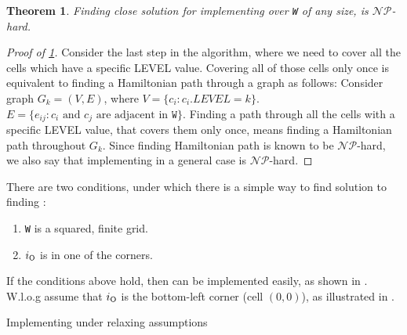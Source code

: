 \documentclass[a4paper,11pt]{article}
\newtheorem{theorem}{Theorem}
\theoremstyle{definition}
\newcommand{\opp}{{{\sf O}}\xspace}
\newcommand{\io}{{\ensuremath{i_{\opp}}}\xspace}
\newcommand{\w}{{{\texttt W}}\xspace}
\newcommand{\ltr}{{{\sf{LTR}}}\xspace}
\DeclarePairedDelimiter\abs{\lvert}{\rvert}%
\begin{document}
\begin{theorem}
Finding close solution for implementing \ltr over \w of any size, is $\mathcal{NP}$-hard.
\label{theorems: ltr hardness}
\end{theorem}
\begin{proof}[Proof of \cref{theorems: ltr hardness}]
Consider the last step in the algorithm, where we need to cover all the cells which have a specific LEVEL value.
Covering all of those cells only once is equivalent to finding a Hamiltonian path through a graph as follows:
Consider graph $G_k=(V,E)$, where $V=\lbrace c_i : c_i.LEVEL=k \rbrace$. $E=\lbrace e_{ij} : c_i \text{ and } c_j \text{ are adjacent in } \w \rbrace$. Finding a path through all the cells with a specific LEVEL value, that covers them only once, means finding a Hamiltonian path throughout $G_k$. Since finding Hamiltonian path is known to be $\mathcal{NP}$-hard, we also say that implementing \ltr in a general case is $\mathcal{NP}$-hard.
\end{proof}

There are two conditions, under which there is a simple way to find solution to finding \ltr:
\begin{enumerate}
    \item \w is a squared, finite grid.
    \item $i_{\opp}$ is in one of the corners.
\end{enumerate}

If the conditions above hold, then \ltr can be implemented easily, as shown in .
W.l.o.g assume that $\io$ is the bottom-left corner (cell $(0,0)$), as illustrated in . 

\begin{algorithm}
    \begin{algorithmic}
    \FOR{$k=2$ \TO $k=\abs*{\w}$ } 
        \ELSE 
        \ENDIF
    \ENDFOR
    
    \end{algorithmic}
    \caption{Implementing \ltr under relaxing assumptions}\label{algorithms: ltr solution under assumptions}
\end{algorithm}
\end{document}

